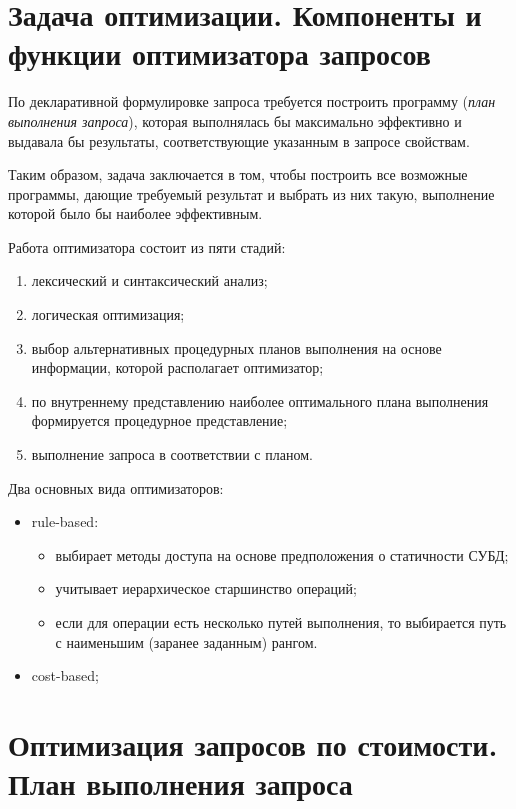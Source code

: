 \section{Задача оптимизации. Компоненты и функции оптимизатора запросов}

\begin{problem}
	По декларативной формулировке запроса требуется построить программу (\emph{план выполнения запроса}), которая выполнялась бы максимально эффективно и выдавала бы результаты, соответствующие указанным в запросе свойствам.
\end{problem}

Таким образом, задача заключается в том, чтобы построить все возможные программы, дающие требуемый результат и выбрать из них такую, выполнение которой было бы наиболее эффективным.

Работа оптимизатора состоит из пяти стадий:
\begin{enumerate}
	\item лексический и синтаксический анализ;
	\item логическая оптимизация;
	\item выбор альтернативных процедурных планов выполнения на основе информации, которой располагает оптимизатор;
	\item по внутреннему представлению наиболее оптимального плана выполнения формируется процедурное представление;
	\item выполнение запроса в соответствии с планом.
\end{enumerate}

Два основных вида оптимизаторов:
\begin{itemize}
	\item rule-based:
		\begin{itemize}
			\item выбирает методы доступа на основе предположения о статичности СУБД;
			\item учитывает иерархическое старшинство операций;
			\item если для операции есть несколько путей выполнения, то выбирается путь с наименьшим (заранее заданным) рангом.
		\end{itemize}
	\item cost-based;
\end{itemize}

\section{Оптимизация запросов по стоимости. План выполнения запроса}

